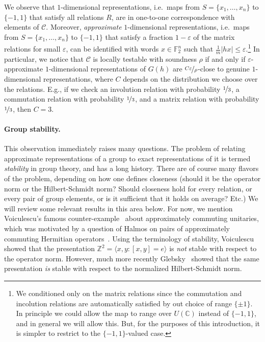 \documentclass[11pt]{article}
\theoremstyle{definition}
\newcommand{\code}{\mathscr{C}}
\newcommand{\C}{\ensuremath{\mathbb{C}}}
\newcommand{\F}{\ensuremath{\mathbb{F}}}
\newcommand{\Z}{\ensuremath{\mathbb{Z}}}
\newcommand{\eps}{\varepsilon}
\begin{document}
We observe that $1$-dimensional representations, i.e.\ maps from $S=\{x_1,\ldots,x_n\}$ to $\{-1,1\}$ that satisfy all relations $R$, are in one-to-one correspondence with elements of $\code$. Moreover, \emph{approximate} $1$-dimensional representations, i.e.\ maps from  $S=\{x_1,\ldots,x_n\}$ to $\{-1,1\}$ that satisfy a fraction $1-\eps$ of the matrix relations for small $\eps$, can be identified with words $x\in\F_2^n$ such that $\frac{1}{m}|hx|\leq \eps$.\footnote{We conditioned only on the matrix relations since the commutation and incolution relations are automatically satisfied by out choice of range $\{\pm1\}$. In principle we could allow the map to range over $U(\C)$ instead of $\{-1,1\}$, and in general we will allow this. But, for the purposes of this introduction, it is simpler to restrict to the $\{-1,1\}$-valued case.} In particular, we notice that $\code$ is locally testable with soundness $\rho$ if and only if $\eps$-approximate $1$-dimensional representations of $G(h)$ are $\nicefrac{C\eps}{\rho}$-close to genuine $1$-dimensional representations, where $C$ depends on the distribution we choose over the relations. E.g., if we check an involution relation with probability $\nicefrac{1}{3}$, a commutation relation with probability $\nicefrac{1}{3}$, and a matrix relation with probability $\nicefrac{1}{3}$, then $C=3$.

\paragraph{Group stability.}
This observation immediately raises many questions. The problem of relating approximate representations of a group to exact representations of it is termed \emph{stability} in group theory, and has a long history. There are of course many flavors of the problem, depending on how one defines closeness (should it be the operator norm or the Hilbert-Schmidt norm? Should closeness hold for every relation, or every pair of group elements, or is it sufficient that it holds on average? Etc.) We will review some relevant results in this area below. For now, we mention Voiculescu's famous counter-example~\cite{voiculescu1983asymptotically} about approximately commuting unitaries, which was motivated by a question of Halmos on pairs of approximately commuting Hermitian operators~\cite{halmos1976some}. Using the terminology of stability, Voiculescu showed that the presentation $\Z^2 = \langle x,y:[x,y]=e\rangle$ is \emph{not} stable with respect to the operator norm. However, much more recently Glebsky~\cite{glebsky2010almost} showed that the same presentation \emph{is} stable with respect to the normalized Hilbert-Schmidt norm. 
\end{document}
